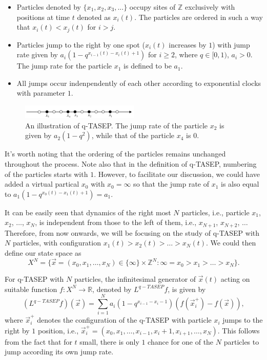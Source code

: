 \begin{itemize}
\item Particles denoted by $\{x_1, x_2, x_3, ...\}$ occupy sites of $\mathbb{Z}$ exclusively with positions at time $t$ denoted as $x_i(t)$. The particles are ordered in such a way that $x_i(t) < x_j(t)$ for $i > j$.
\item Particles jump to the right by one spot ($x_i(t)$ increases by $1$) with jump rate given by $a_i (1-q^{x_{i-1}(t)-x_i(t)+1})$ for $i \ge 2$, where $q \in [0,1)$, $a_i > 0$. The jump rate for the particle $x_1$ is defined to be $a_1$.
\item All jumps occur indenpendently of each other according to exponential clocks with parameter $1$.
\end{itemize}

\begin{figure}
	\centering
	\includegraphics[width=0.5\textwidth]{q-TASEP}
	\caption[An illustration of q-TASEP]
	{An illustration of q-TASEP. The jump rate of the particle $x_2$ is given by $a_2(1-q^2)$, while that of the particle $x_4$ is $0$.}
	\label{fig:q-TASEP}
\end{figure}

It's worth noting that the ordering of the particles remains unchanged throughout the process. Note also that in the definition of q-TASEP, numbering of the particles starts with $1$. However, to facilitate our discussion, we could have added a virtual partical $x_0$ with $x_0 = \infty$ so that the jump rate of $x_1$ is also equal to $a_1 (1-q^{x_0(t) - x_1(t) + 1}) = a_1$. 

It can be easily seen that dynamics of the right most $N$ particles, i.e., particle $x_1$, $x_2$, $\dots$, $x_N$, is independent from those to the left of them, i.e., $x_{N+1}$, $x_{N+2}$, $\dots$ Therefore, from now onwards, we will be focusing on the study of q-TASEP with $N$ particles, with configuration $x_1(t) > x_2(t) > \dots > x_N(t)$. We could then define our state space as $$X^N = \{\vec{x}=(x_0,x_1,\dots, x_N) \in \{\infty \} \times \mathbb{Z}^N : \infty = x_0 > x_1 > \dots > x_N \}.$$

For q-TASEP with $N$ particles, the infinitesimal generator of $\vec{x}(t)$ acting on suitable function $f: X^N \rightarrow \mathbb{R}$, denoted by $L^{q-TASEP} f$, is given by $$(L^{q-TASEP} f) (\vec{x}) = \sum_{i=1}^{N} a_i (1-q^{x_{i-1} - x_i - 1}) (f(\vec{x}_i^{+}) - f(\vec{x})),$$ where $\vec{x}_i^{+}$ denotes the configuration of the q-TASEP with particle $x_i$ jumps to the right by $1$ position, i.e., $\vec{x}_i^+ = (x_0, x_1, \dots, x_{i-1}, x_i+1, x_{i+1}, \dots, x_N)$. This follows from the fact that for $t$ small, there is only $1$ chance for one of the $N$ particles to jump according its own jump rate.

